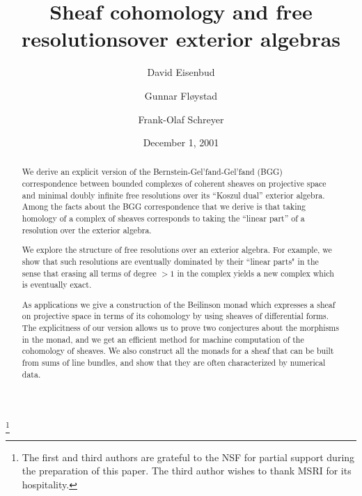 \documentclass{tran-l}
\theoremstyle{plain}
\theoremstyle{remark}
\theoremstyle{definition}
\begin{document}
\title[Sheaf cohomology and free resolutions]
{Sheaf cohomology and free resolutions\linebreak[1] over exterior algebras}
\author[D. Eisenbud]{David Eisenbud}
\address{Department of Mathematics, University of California Berkeley,
Berkeley, California 94720}

\author[G. Fl\o ystad]{Gunnar Fl\o ystad}
\address{Mathematisk Institutt, Johs. Brunsgt. 12,
N-5008 Bergen, Norway}

\author[F.-O. Schreyer]{Frank-Olaf Schreyer}
\address{FB Mathematik, Universit\"{a}t Bayreuth
D-95440 Bayreuth, Germany}

\date{December 1, 2001}
\thanks{The first and third authors are grateful to the NSF for
partial support during the preparation of this paper.
The third author wishes to thank MSRI for its hospitality.}
\begin{abstract}
We derive an explicit version of the
Bernstein-Gel'fand-Gel'fand (BGG) correspondence between bounded
complexes of coherent sheaves on projective space and minimal doubly
infinite free resolutions over its ``Koszul dual'' exterior algebra.
Among the facts about the BGG correspondence that we derive is that
taking homology of a complex of sheaves corresponds to taking the
``linear part'' of a resolution over the exterior algebra.

We explore the structure of
free resolutions over an exterior algebra. For example,
we show that such resolutions are eventually dominated by their
``linear parts" in the sense that erasing all terms of degree $>1$ in
the complex yields a new complex which is eventually exact.

As applications we give a construction of the Beilinson monad which
expresses a sheaf on projective space in terms of its cohomology by
using sheaves of differential forms. The explicitness of our version
allows us to prove two conjectures about the morphisms in the monad,
and we get an efficient method for machine computation of the
cohomology of sheaves. We also construct all the monads for a sheaf
that can be built from sums of line bundles, and show that they are often
characterized by numerical data.
\end{abstract}
\maketitle
\end{document}
